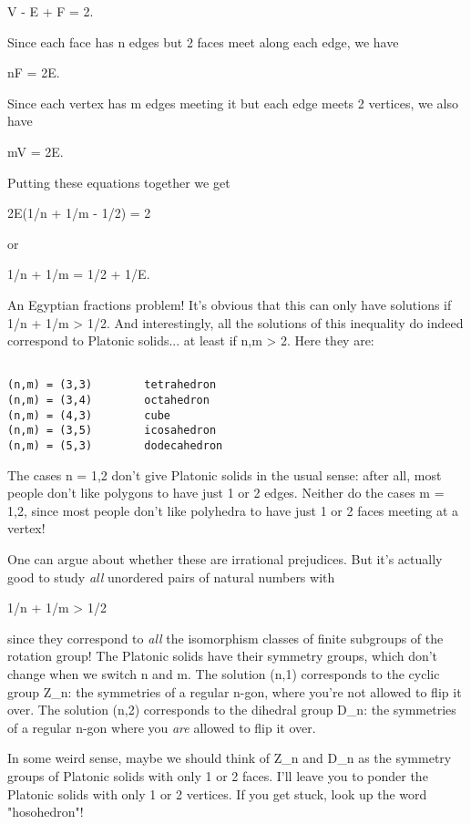 V - E + F = 2.

Since each face has n edges but 2 faces meet along each edge,
we have

nF = 2E.

Since each vertex has m edges meeting it but each edge
meets 2 vertices, we also have

mV = 2E.

Putting these equations together we get

2E(1/n + 1/m - 1/2) = 2

or

1/n + 1/m = 1/2 + 1/E.

An Egyptian fractions problem!  It's obvious that this can only
have solutions if 1/n + 1/m > 1/2.  And interestingly, all the
solutions of this inequality do indeed correspond to Platonic solids... 
at least if n,m > 2.  Here they are:


\begin{verbatim}

(n,m) = (3,3)        tetrahedron
(n,m) = (3,4)        octahedron
(n,m) = (4,3)        cube
(n,m) = (3,5)        icosahedron
(n,m) = (5,3)        dodecahedron
\end{verbatim}
    

The cases n = 1,2 don't give Platonic solids in the usual sense:
after all, most people don't like polygons to have just 1 or 2 edges. 
Neither do the cases m = 1,2, since most people don't like polyhedra 
to have just 1 or 2 faces meeting at a vertex!  

One can argue about whether these are irrational prejudices.  But it's
actually good to study \emph{all} unordered pairs of natural numbers with

1/n + 1/m > 1/2 


since they correspond to \emph{all} the isomorphism classes of finite
subgroups of the rotation group!  The Platonic solids have their
symmetry groups, which don't change when we switch n and m.  The
solution (n,1) corresponds to the cyclic group Z_{n}: the
symmetries of a regular n-gon, where you're not allowed to flip it over.
The solution (n,2) corresponds to the dihedral group D_{n}: the
symmetries of a regular n-gon where you \emph{are} allowed to flip it
over.


In some weird sense, maybe we should think of Z_{n} and
D_{n} as the symmetry groups of Platonic solids with only 1 or 2
faces.  I'll leave you to ponder the Platonic solids with only 1 or 2
vertices.  If you get stuck, look up the word "hosohedron"!

